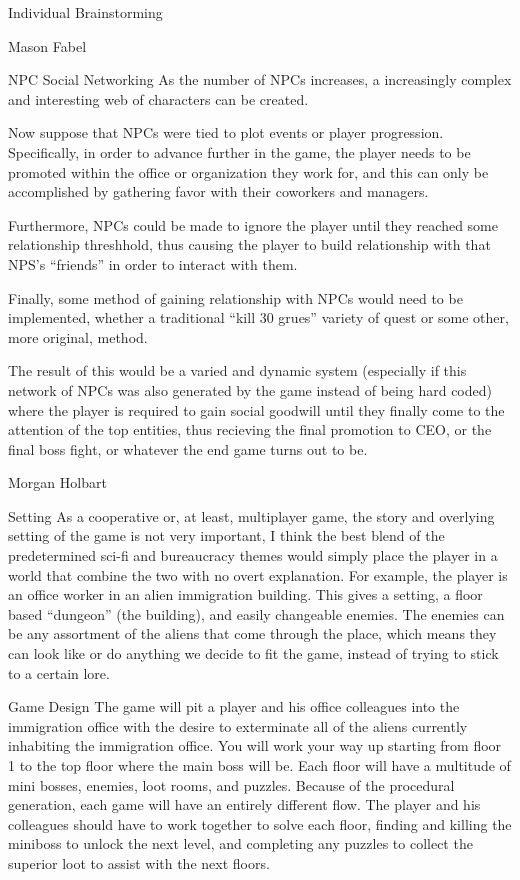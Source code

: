 \documentclass[12pt]{report}
\begin{document}
\begin{section}{Individual Brainstorming}
\begin{subsection}{Mason Fabel}
\begin{subsubsection}{NPC Social Networking}
As the number of NPCs increases, a increasingly complex and interesting web
of characters can be created.

Now suppose that NPCs were tied to plot events or player progression.
Specifically, in order to advance further in the game, the player needs
to be promoted within the office or organization they work for, and this
can only be accomplished by gathering favor with their coworkers and
managers.

Furthermore, NPCs could be made to ignore the player until they reached
some relationship threshhold, thus causing the player to build relationship
with that NPS's ``friends'' in order to interact with them.

Finally, some method of gaining relationship with NPCs would need to be
implemented, whether a traditional ``kill 30 grues'' variety of quest or
some other, more original, method.

The result of this would be a varied and dynamic system (especially if this
network of NPCs was also generated by the game instead of being hard coded)
where the player is required to gain social goodwill until they finally
come to the attention of the top entities, thus recieving the final
promotion to CEO, or the final boss fight, or whatever the end game turns
out to be.
\end{subsubsection}
\end{subsection}

\begin{subsection}{Morgan Holbart}
\begin{subsubsection}{Setting}
As a cooperative or, at least, multiplayer game, the story and overlying
setting of the game is not very important, I think the best blend of the
predetermined sci-fi and bureaucracy themes would simply place the player
in a world that combine the two with no overt explanation. For example,
the player is an office worker in an alien immigration building.
This gives a setting, a floor based ``dungeon'' (the building), and easily
changeable enemies. The enemies can be any assortment of the aliens that
come through the place, which means they can look like or do anything we
decide to fit the game, instead of trying to stick to a certain lore.
\end{subsubsection}

\begin{subsubsection}{Game Design}
The game will pit a player and his office colleagues into the immigration
office with the desire to exterminate all of the aliens currently inhabiting
the immigration office. You will work your way up starting from floor 1 to
the top floor where the main boss will be. Each floor will have a multitude
of mini bosses, enemies, loot rooms, and puzzles. Because of the procedural
generation, each game will have an entirely different flow. The player and
his colleagues should have to work together to solve each floor, finding and
killing the miniboss to unlock the next level, and completing any puzzles
to collect the superior loot to assist with the next floors.


\end{subsubsection}
\end{subsection}
\end{section}
\end{document}
